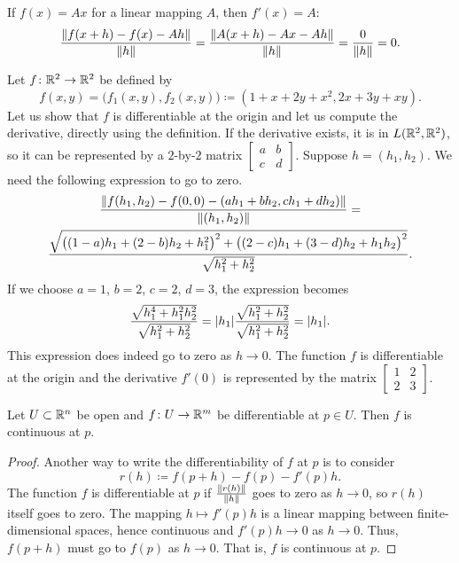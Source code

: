 \begin{example}
If $f(x) = Ax$ for a linear mapping $A$, then
$f'(x) = A$:
\begin{equation*}
\frac{\lVert {f(x+h)-f(x) - Ah} \rVert}{\lVert {h} \rVert}
=
\frac{\lVert {A(x+h)-Ax - Ah} \rVert}{\lVert {h} \rVert}
=
\frac{0}{\lVert {h} \rVert} = 0 .
\end{equation*}
\end{example}

\begin{example}
Let $f \colon {\mathbb{R}}^2 \to {\mathbb{R}}^2$ be defined by
\begin{equation*}
f(x,y) = \bigl(f_1(x,y),f_2(x,y)\bigr) \coloneqq (1+x+2y+x^2,2x+3y+xy).
\end{equation*}
Let us show that $f$ is differentiable at the origin and let us 
compute the derivative,
directly using the definition.  If the
derivative exists, it is in $L({\mathbb{R}}^2,{\mathbb{R}}^2)$, so it can be
represented by a $2$-by-$2$ matrix
$\left[\begin{smallmatrix}a&b\\c&d\end{smallmatrix}\right]$.  Suppose $h =
(h_1,h_2)$.  We need the following expression to go to zero.
\begin{multline*}
\frac{\lVert {
f(h_1,h_2)-f(0,0)
-
(ah_1 +bh_2 , ch_1+dh_2)} \rVert
}{\lVert {(h_1,h_2)} \rVert}
=
\\
\frac{\sqrt{
{\bigl((1-a)h_1 + (2-b)h_2 + h_1^2\bigr)}^2
+
{\bigl((2-c)h_1 + (3-d)h_2 + h_1h_2\bigr)}^2}}{\sqrt{h_1^2+h_2^2}} .
\end{multline*}
If we choose $a=1$, $b=2$, $c=2$, $d=3$, the expression becomes
\begin{equation*}
\frac{\sqrt{
h_1^4 + h_1^2h_2^2}}{\sqrt{h_1^2+h_2^2}}
=
\lvert {h_1} \rvert
\frac{\sqrt{
h_1^2 + h_2^2}}{\sqrt{h_1^2+h_2^2}}
= \lvert {h_1} \rvert .
\end{equation*}
This expression does indeed go to zero as $h \to 0$.  The
function $f$ is differentiable at the origin and 
the derivative $f'(0)$ is represented by the matrix
$\left[\begin{smallmatrix}1&2\\2&3\end{smallmatrix}\right]$.
\end{example}

\begin{prop}
Let $U \subset {\mathbb{R}}^n$ be open and $f \colon U \to {\mathbb{R}}^m$ be
differentiable at $p \in U$.  Then $f$ is continuous at $p$.
\end{prop}

\begin{proof}
Another way to write the differentiability of $f$ at $p$ is to consider
\begin{equation*}
r(h) \coloneqq f(p+h)-f(p) - f'(p) h .
\end{equation*}
The function $f$ is differentiable at $p$ if
$\frac{\lVert {r(h)} \rVert}{\lVert {h} \rVert}$ goes to zero as $h \to 0$,
so
$r(h)$ itself goes to zero.  The mapping $h \mapsto f'(p) h$
is a linear mapping between finite-dimensional spaces, hence continuous
and $f'(p) h \to 0$ as $h \to 0$.  Thus,
$f(p+h)$ must go to $f(p)$ as $h \to 0$.  That is, $f$ is continuous at $p$.
\end{proof}

